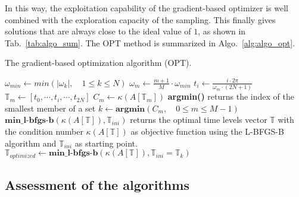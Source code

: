 In this way, the exploitation capability of the gradient-based
optimizer is well combined with the exploration capacity of the
sampling.  This finally gives solutions that are always close to the
ideal value of $1$, as shown in Tab.~\ref{tab:algo_sum}.  The OPT
method is summarized in Algo.~\ref{alg:algo_opt}.
\begin{algorithm}
\caption{The gradient-based optimization algorithm (OPT).}
\label{alg:algo_opt}
\begin{algorithmic}
\STATE $\omega_{min} \leftarrow min \left( |\omega_k |,\quad 1 \leqslant k \leqslant N \right)$
    \STATE $\omega_m \leftarrow \frac{m + 1}{M} \cdot \omega_{min}$
        \STATE $t_i \leftarrow \displaystyle\frac{i \cdot 2 \pi}{\omega_m \cdot (2N + 1)}$
    \ENDFOR
    \STATE $\mathbb{T}_m \leftarrow [t_0, \cdots, t_i, \cdots, t_{2N}]$
    \STATE $C_m \leftarrow \kappa \left(A \left[\mathbb{T}_m \right] \right)$
\ENDFOR
\STATE \textbf{argmin()} returns the index of the smallest member of a set
\STATE $k \leftarrow \textbf{argmin}\left(C_m,\quad 0\leqslant m \leqslant M-1\right)$
\STATE $\textbf{min\_l-bfgs-b}\left(\kappa \left(A\left[\mathbb{T}\right]\right), \mathbb{T}_{ini}\right)$ returns the optimal 
time levels vector $\mathbb{T}$ with the condition number $\kappa\left(A\left[\mathbb{T}\right]\right)$ as objective function 
using the L-BFGS-B algorithm and  $\mathbb{T}_{ini}$ as starting point.
\STATE $\mathbb{T}_{optimized} \leftarrow \textbf{min\_l-bfgs-b}\left(\kappa\left(A\left[\mathbb{T}\right]\right), \mathbb{T}_{ini}=\mathbb{T}_k\right)$
\end{algorithmic}
\end{algorithm}

\subsection{Assessment of the algorithms}

